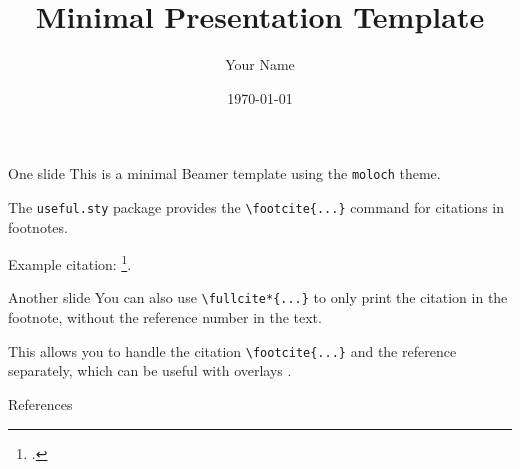 \documentclass[aspectratio=169,10pt]{beamer}
\title{Minimal Presentation Template}
\author{Your Name}
\institute{Your Institute}
\date{\today}
\begin{document}
\maketitle

\begin{frame}[fragile]{One slide}
  This is a minimal Beamer template using the \texttt{moloch} theme.

  The \texttt{useful.sty} package provides the \verb|\footcite{...}| command for citations in footnotes.

  Example citation: \footcite{kautz_ThirdAISummerAAAI_2022}.
\end{frame}

\begin{frame}[fragile]{Another slide}
  You can also use \verb|\fullcite*{...}| to only print the citation in the footnote, without the reference number in the text. 

  \pause
  This allows you to handle the citation \verb|\footcite{...}| and the reference separately, which can be useful with overlays \autocite{kautz_ThirdAISummerAAAI_2022}.
\end{frame}

\begin{frame}[allowframebreaks]{References}
  \printbibliography[heading=none]
\end{frame}
\end{document}
